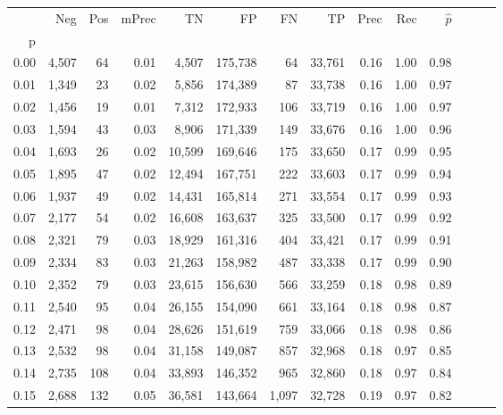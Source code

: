 \begin{tabular}{rrrrrrrrrrrrrr}
\toprule
{} &    Neg &    Pos & mPrec &       TN &       FP &      FN &      TP &  Prec &   Rec & $\hat{p}$ \\
p    &        &        &       &          &          &         &         &       &       &           \\
\midrule
0.00 &  4,507 &     64 &  0.01 &    4,507 &  175,738 &      64 &  33,761 &  0.16 &  1.00 &      0.98 \\
0.01 &  1,349 &     23 &  0.02 &    5,856 &  174,389 &      87 &  33,738 &  0.16 &  1.00 &      0.97 \\
0.02 &  1,456 &     19 &  0.01 &    7,312 &  172,933 &     106 &  33,719 &  0.16 &  1.00 &      0.97 \\
0.03 &  1,594 &     43 &  0.03 &    8,906 &  171,339 &     149 &  33,676 &  0.16 &  1.00 &      0.96 \\
0.04 &  1,693 &     26 &  0.02 &   10,599 &  169,646 &     175 &  33,650 &  0.17 &  0.99 &      0.95 \\
0.05 &  1,895 &     47 &  0.02 &   12,494 &  167,751 &     222 &  33,603 &  0.17 &  0.99 &      0.94 \\
0.06 &  1,937 &     49 &  0.02 &   14,431 &  165,814 &     271 &  33,554 &  0.17 &  0.99 &      0.93 \\
0.07 &  2,177 &     54 &  0.02 &   16,608 &  163,637 &     325 &  33,500 &  0.17 &  0.99 &      0.92 \\
0.08 &  2,321 &     79 &  0.03 &   18,929 &  161,316 &     404 &  33,421 &  0.17 &  0.99 &      0.91 \\
0.09 &  2,334 &     83 &  0.03 &   21,263 &  158,982 &     487 &  33,338 &  0.17 &  0.99 &      0.90 \\
0.10 &  2,352 &     79 &  0.03 &   23,615 &  156,630 &     566 &  33,259 &  0.18 &  0.98 &      0.89 \\
0.11 &  2,540 &     95 &  0.04 &   26,155 &  154,090 &     661 &  33,164 &  0.18 &  0.98 &      0.87 \\
0.12 &  2,471 &     98 &  0.04 &   28,626 &  151,619 &     759 &  33,066 &  0.18 &  0.98 &      0.86 \\
0.13 &  2,532 &     98 &  0.04 &   31,158 &  149,087 &     857 &  32,968 &  0.18 &  0.97 &      0.85 \\
0.14 &  2,735 &    108 &  0.04 &   33,893 &  146,352 &     965 &  32,860 &  0.18 &  0.97 &      0.84 \\
0.15 &  2,688 &    132 &  0.05 &   36,581 &  143,664 &   1,097 &  32,728 &  0.19 &  0.97 &      0.82 \\

\end{tabular}
